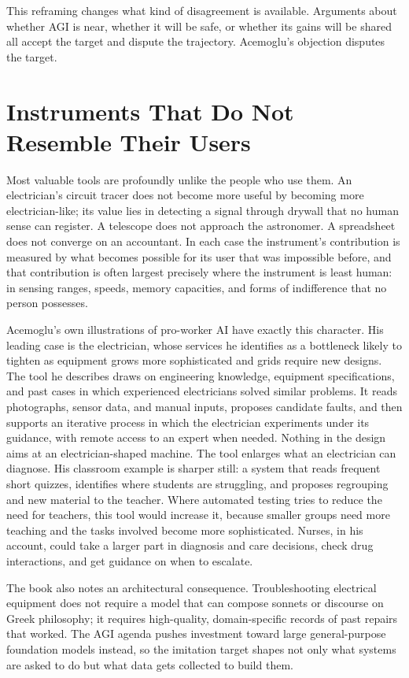 \documentclass[11pt]{article}
\begin{document}
This reframing changes what kind of disagreement is available. Arguments about whether AGI is near, whether it will be safe, or whether its gains will be shared all accept the target and dispute the trajectory. Acemoglu's objection disputes the target.

\section{Instruments That Do Not Resemble Their Users}

Most valuable tools are profoundly unlike the people who use them. An electrician's circuit tracer does not become more useful by becoming more electrician-like; its value lies in detecting a signal through drywall that no human sense can register. A telescope does not approach the astronomer. A spreadsheet does not converge on an accountant. In each case the instrument's contribution is measured by what becomes possible for its user that was impossible before, and that contribution is often largest precisely where the instrument is least human: in sensing ranges, speeds, memory capacities, and forms of indifference that no person possesses.

Acemoglu's own illustrations of pro-worker AI have exactly this character. His leading case is the electrician, whose services he identifies as a bottleneck likely to tighten as equipment grows more sophisticated and grids require new designs. The tool he describes draws on engineering knowledge, equipment specifications, and past cases in which experienced electricians solved similar problems. It reads photographs, sensor data, and manual inputs, proposes candidate faults, and then supports an iterative process in which the electrician experiments under its guidance, with remote access to an expert when needed. Nothing in the design aims at an electrician-shaped machine. The tool enlarges what an electrician can diagnose. His classroom example is sharper still: a system that reads frequent short quizzes, identifies where students are struggling, and proposes regrouping and new material to the teacher. Where automated testing tries to reduce the need for teachers, this tool would increase it, because smaller groups need more teaching and the tasks involved become more sophisticated. Nurses, in his account, could take a larger part in diagnosis and care decisions, check drug interactions, and get guidance on when to escalate.

The book also notes an architectural consequence. Troubleshooting electrical equipment does not require a model that can compose sonnets or discourse on Greek philosophy; it requires high-quality, domain-specific records of past repairs that worked. The AGI agenda pushes investment toward large general-purpose foundation models instead, so the imitation target shapes not only what systems are asked to do but what data gets collected to build them.
\end{document}
